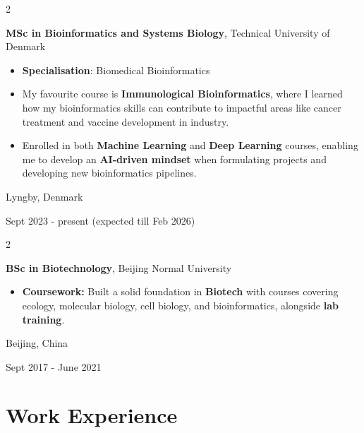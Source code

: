 \documentclass[10pt, letterpaper]{article}
\newenvironment{highlights}{
    \begin{itemize}[
        topsep=0.10 cm,
        parsep=0.10 cm,
        partopsep=0pt,
        itemsep=0pt,
        leftmargin=0.4 cm + 10pt
    ]
}{
    \end{itemize}
} %
\newenvironment{twocolentry}[2][]{
    \onecolentry
    \def\secondColumn{#2}
    \setcolumnwidth{\fill, 4.5 cm}
    \begin{paracol}{2}
}{
    \switchcolumn \raggedleft \secondColumn
    \end{paracol}
    \endonecolentry
} %
\begin{document}
        
        \begin{twocolentry}{
    Lyngby, Denmark

    Sept 2023 - present (expected till Feb 2026)
}
    \textbf{MSc in Bioinformatics and Systems Biology}, Technical University of Denmark
    \begin{highlights}
        \item \textbf{Specialisation}: Biomedical Bioinformatics
        \item My favourite course is \textbf{Immunological Bioinformatics}, where I learned how my bioinformatics skills can contribute to impactful areas like cancer treatment and vaccine development in industry.
        \item Enrolled in both \textbf{Machine Learning} and \textbf{Deep Learning} courses, enabling me to develop an \textbf{AI-driven mindset} when formulating projects and developing new bioinformatics pipelines. 
    \end{highlights}
\end{twocolentry}


        \vspace{0.3 cm}

\begin{twocolentry}{
    Beijing, China
    
    Sept 2017 - June 2021
}
    \textbf{BSc in Biotechnology}, Beijing Normal University
    \begin{highlights}
        \item \textbf{Coursework:} Built a solid foundation in \textbf{Biotech} with courses covering ecology, molecular biology, cell biology, and bioinformatics, alongside \textbf{lab training}.
    \end{highlights}
\end{twocolentry}


    
    
    \section{Work Experience}
\end{document}
